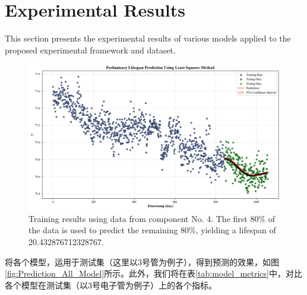 \section{Experimental Results}
\label{sec:Experimental Results}
This section presents the experimental results of various models applied to the proposed experimental framework and dataset.

\begin{figure}[H]
	\centering
	\includegraphics[width=\linewidth]{figures/sourceModelTraining_Prediction}
	\caption{Training results using data from component No. 4. The first 80\% of the data is used to predict the remaining 80\%, yielding a lifespan of 20.432876712328767.}

	\label{fig:sourceModelTraining_Prediction}
\end{figure}

将各个模型，运用于测试集（这里以3号管为例子），得到预测的效果，如图\ref{fig:Prediction_All_Model}所示。此外，我们将在表\ref{tab:model_metrics}中，对比各个模型在测试集（以3号电子管为例子）上的各个指标。


\begin{table}[H]
	\centering
	\caption{Performance Metrics for Various Models}
	\label{tab:model_metrics}
\end{table}




